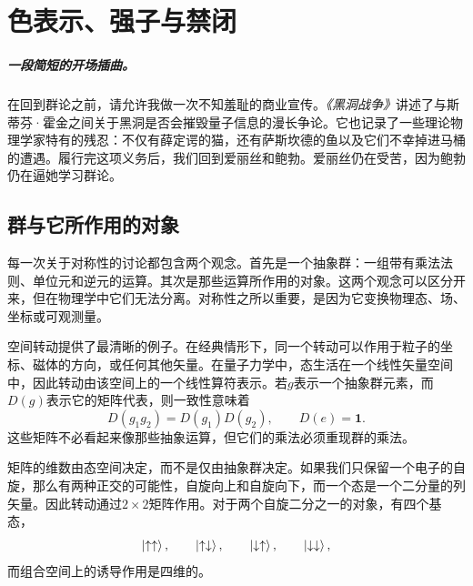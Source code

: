 \chapter{色表示、强子与禁闭}

\paragraph{一段简短的开场插曲。}
在回到群论之前，请允许我做一次不知羞耻的商业宣传。\emph{《黑洞战争》}讲述了与斯蒂芬·霍金之间关于黑洞是否会摧毁量子信息的漫长争论。它也记录了一些理论物理学家特有的残忍：不仅有薛定谔的猫，还有萨斯坎德的鱼以及它们不幸掉进马桶的遭遇。履行完这项义务后，我们回到爱丽丝和鲍勃。爱丽丝仍在受苦，因为鲍勃仍在逼她学习群论。


\section{群与它所作用的对象}

每一次关于对称性的讨论都包含两个观念。首先是一个抽象群：一组带有乘法法则、单位元和逆元的运算。其次是那些运算所作用的对象。这两个观念可以区分开来，但在物理学中它们无法分离。对称性之所以重要，是因为它变换物理态、场、坐标或可观测量。

\begin{classroomqa}
\end{classroomqa}

空间转动提供了最清晰的例子。在经典情形下，同一个转动可以作用于粒子的坐标、磁体的方向，或任何其他矢量。在量子力学中，态生活在一个线性矢量空间中，因此转动由该空间上的一个线性算符表示。若\(g\)表示一个抽象群元素，而\(D(g)\)表示它的矩阵代表，则一致性意味着
\begin{equation}
D(g_1g_2)=D(g_1)D(g_2),
\qquad
D(e)=\boldsymbol 1.
\end{equation}
这些矩阵不必看起来像那些抽象运算，但它们的乘法必须重现群的乘法。

矩阵的维数由态空间决定，而不是仅由抽象群决定。如果我们只保留一个电子的自旋，那么有两种正交的可能性，自旋向上和自旋向下，而一个态是一个二分量的列矢量。因此转动通过\(2\times2\)矩阵作用。对于两个自旋二分之一的对象，有四个基态，
\begin{equation}
\left\lvert\uparrow\uparrow\right\rangle,\qquad
\left\lvert\uparrow\downarrow\right\rangle,\qquad
\left\lvert\downarrow\uparrow\right\rangle,\qquad
\left\lvert\downarrow\downarrow\right\rangle,
\end{equation}
而组合空间上的诱导作用是四维的。

